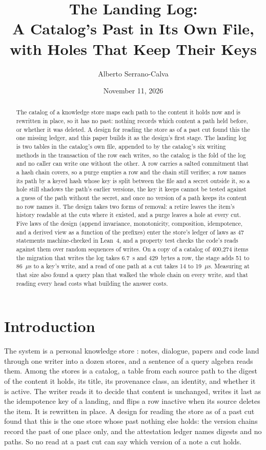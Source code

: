 \documentclass[11pt]{article}
\title{The Landing Log:\\
A Catalog's Past in Its Own File, with Holes That Keep Their Keys}
\author{Alberto Serrano-Calva}
\date{November 11, 2026}
\theoremstyle{plain}
\theoremstyle{definition}
\begin{document}
\maketitle

\begin{abstract}
The catalog of a knowledge store maps each path to the content it holds now and is rewritten in
place, so it has no past: nothing records which content a path held before, or whether it was
deleted. A design for reading the store as of a past cut found this the one missing ledger, and
this paper builds it as the design's first stage. The landing log is two tables in the catalog's
own file, appended to by the catalog's six writing methods in the transaction of the row each
writes, so the catalog is the fold of the log and no caller can write one without the other. A
row carries a salted commitment that a hash chain covers, so a purge empties a row and the chain
still verifies; a row names its path by a keyed hash whose key is split between the file and a
secret outside it, so a hole still shadows the path's earlier versions, the key it keeps cannot be
tested against a guess of the path without the secret, and once no version of a path keeps its
content no row names it. The design takes two forms of removal: a retire leaves the item's
history readable at the cuts where it existed, and a purge leaves a hole at every cut. Five laws
of the design (append invariance, monotonicity, composition, idempotence, and a derived view as a
function of the prefixes) enter the store's ledger of laws as 47 statements machine-checked in
Lean~4, and a property test checks the code's reads against them over random sequences of writes.
On a copy of a catalog of 400{,}274 items the migration that writes the log takes 6.7~s and
429~bytes a row, the stage adds 51 to 86~$\mu$s to a key's write, and a read of one path at a cut
takes 14 to 19~$\mu$s. Measuring at that size also found a query plan that walked the whole chain
on every write, and that reading every head costs what building the answer costs.
\end{abstract}

\section{Introduction}

The system is a personal knowledge store \cite{serranocalva2026palace}: notes, dialogue, papers and
code land through one writer into a dozen stores, and a sentence of a query algebra reads them.
Among the stores is a catalog, a table from each source path to the digest of the content it
holds, its title, its provenance class, an identity, and whether it is active. The writer reads it
to decide that content is unchanged, writes it last as the idempotence key of a landing, and
flips a row inactive when its source deletes the item. It is rewritten in place. A design for
reading the store as of a past cut \cite{serranocalva2026palace} found that this is the one store
whose past nothing else holds: the version chains record the past of one place only, and the
attestation ledger names digests and no paths. So no read at a past cut can say which version of
a note a cut holds.
\end{document}
